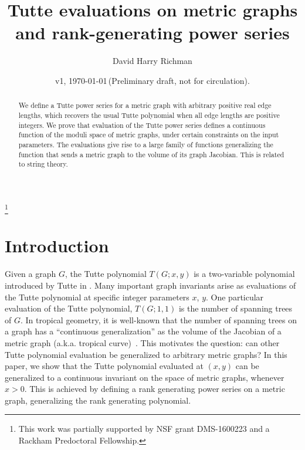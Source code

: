 \documentclass{amsart}
\theoremstyle{definition}
\begin{document}
\title
[Tutte evaluations on metric graphs]
{Tutte evaluations on metric graphs and rank-generating power series}
\author{David Harry Richman}
\date{v1, \today  \,(Preliminary draft, not for circulation).}
\thanks{This work was partially supported by NSF grant DMS-1600223
and a Rackham Predoctoral Fellowship.}


\begin{abstract}
We define a %
Tutte power series for a metric graph with arbitrary positive real edge lengths, 
which recovers the usual Tutte polynomial when all edge lengths are positive integers.
We prove that %
evaluation of the Tutte power series
defines a continuous function of the moduli space of metric graphs,
under certain constraints on the input parameters.
The evaluations give rise to a large family of functions generalizing the function that sends a metric graph to the volume of its graph Jacobian.
This is related to string theory.
\end{abstract}
\maketitle

\setcounter{tocdepth}{1}
\tableofcontents

\section{Introduction}
Given a graph $G$, the Tutte polynomial $T(G;x,y)$ is 
a two-variable polynomial %
introduced by Tutte in \cite{Tut}.
Many important graph invariants arise as evaluations of 
the Tutte polynomial %
at specific integer parameters $x$, $y$.
One particular evaluation of the Tutte polynomial, $T(G; 1, 1)$ is the number of spanning trees of $G$.
In tropical geometry, it is well-known that the number of spanning trees on a graph has a ``continuous generalization'' as the volume of the Jacobian of a metric graph (a.k.a. tropical curve)~\cites{MZ,BF,ABKS}.
This motivates the question: can other Tutte polynomial evaluation be generalized to arbitrary metric graphs?
In this paper, we show that the Tutte polynomial evaluated at $(x, y)$ can be generalized to a continuous invariant on the space of metric graphs, whenever $x > 0$.
This is achieved by defining a rank generating power series on a metric graph,
generalizing the rank generating polynomial.
\end{document}
